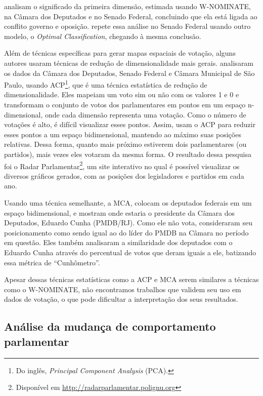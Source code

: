  analisam o significado da primeira dimensão, estimada
usando W-NOMINATE, na Câmara dos Deputados e no Senado Federal, concluindo que
ela está ligada ao conflito governo e oposição.  repete
essa análise no Senado Federal usando outro modelo, o \emph{Optimal
Classification}, chegando à mesma conclusão.

Além de técnicas específicas para gerar mapas espaciais de votação, alguns
autores usaram técnicas de redução de dimensionalidade mais gerais.
 analisaram os dados da Câmara dos Deputados, Senado
Federal e Câmara Municipal de São Paulo, usando \gls{ACP}\footnote{Do inglês,
\emph{Principal Component Analysis} (PCA).}, que é uma técnica estatística de
redução de dimensionalidade. Eles mapeiam um voto sim ou não com os valores 1 e
0 e transformam o conjunto de votos dos parlamentares em pontos em um espaço
n-dimensional, onde cada dimensão representa uma votação. Como o número de
votações é alto, é difícil visualizar esses pontos. Assim, usam o \gls{ACP}
para reduzir esses pontos a um espaço bidimensional, mantendo ao máximo suas
posições relativas. Dessa forma, quanto mais próximo estiverem dois
parlamentares (ou partidos), mais vezes eles votaram da mesma forma. O
resultado dessa pesquisa foi o Radar Parlamentar\footnote{Disponível em
\url{http://radarparlamentar.polignu.org}}, um site interativo no qual é
possível visualizar os diversos gráficos gerados, com as posições dos
legisladores e partidos em cada ano.

Usando uma técnica semelhante, a \gls{MCA},  colocam os
deputados federais em um espaço bidimensional, e mostram onde estaria o
presidente da Câmara dos Deputados, Eduardo Cunha (PMDB/RJ). Como ele não vota,
consideraram seu posicionamento como sendo igual ao do líder do PMDB na Câmara
no período em questão. Eles também analisaram a similaridade dos deputados com
o Eduardo Cunha através do percentual de votos que deram iguais a ele,
batizando essa métrica de ``Cunhômetro''.

Apesar dessas técnicas estatísticas como a \gls{ACP} e \gls{MCA} serem
similares a técnicas como o W-NOMINATE, não encontramos trabalhos que validem
seu uso em dados de votação, o que pode dificultar a interpretação dos seus
resultados.


\subsection{Análise da mudança de comportamento parlamentar}


